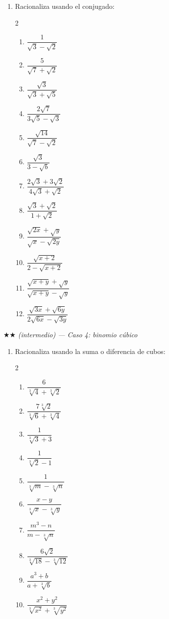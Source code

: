\documentclass[11pt, letterpaper]{article}
\begin{document}
\begin{enumerate}[label=\textbf{\arabic*.}, leftmargin=*, resume]
  \item Racionaliza usando el conjugado:
  \begin{multicols}{2}
  \begin{enumerate}[label=\alph*)]
    \item $\dfrac{1}{\sqrt{3}-\sqrt{2}}$
    \item $\dfrac{5}{\sqrt{7}+\sqrt{2}}$
    \item $\dfrac{\sqrt{3}}{\sqrt{3}+\sqrt{5}}$
    \item $\dfrac{2\sqrt{7}}{3\sqrt{5}-\sqrt{3}}$
    \item $\dfrac{\sqrt{14}}{\sqrt{7}-\sqrt{2}}$
    \item $\dfrac{\sqrt{3}}{3-\sqrt{b}}$
    \item $\dfrac{2\sqrt{3}+3\sqrt{2}}{4\sqrt{3}+\sqrt{2}}$
    \item $\dfrac{\sqrt{3}+\sqrt{2}}{1+\sqrt{2}}$
    \item $\dfrac{\sqrt{2x}+\sqrt{y}}{\sqrt{x}-\sqrt{2y}}$
    \item $\dfrac{\sqrt{x+2}}{2-\sqrt{x+2}}$
    \item $\dfrac{\sqrt{x+y}+\sqrt{y}}{\sqrt{x+y}-\sqrt{y}}$
    \item $\dfrac{\sqrt{3x}+\sqrt{6y}}{2\sqrt{6x}-\sqrt{3y}}$
  \end{enumerate}
  \end{multicols}
\end{enumerate}

$\bigstar\bigstar$ \textit{(intermedio) — Caso 4: binomio cúbico}

\begin{enumerate}[label=\textbf{\arabic*.}, leftmargin=*, resume]
  \item Racionaliza usando la suma o diferencia de cubos:
  \begin{multicols}{2}
  \begin{enumerate}[label=\alph*)]
    \item $\dfrac{6}{\sqrt[3]{4}+\sqrt[3]{2}}$
    \item $\dfrac{7\sqrt[3]{2}}{\sqrt[3]{6}+\sqrt[3]{4}}$
    \item $\dfrac{1}{\sqrt[3]{3}+3}$
    \item $\dfrac{1}{\sqrt[3]{2}-1}$
    \item $\dfrac{1}{\sqrt[3]{m}-\sqrt[3]{n}}$
    \item $\dfrac{x-y}{\sqrt[3]{x}-\sqrt[3]{y}}$
    \item $\dfrac{m^3-n}{m-\sqrt[3]{n}}$
    \item $\dfrac{6\sqrt{2}}{\sqrt[3]{18}-\sqrt[3]{12}}$
    \item $\dfrac{a^3+b}{a+\sqrt[3]{b}}$
    \item $\dfrac{x^2+y^2}{\sqrt[3]{x^2}+\sqrt[3]{y^2}}$
  \end{enumerate}
  \end{multicols}
\end{enumerate}
\end{document}
